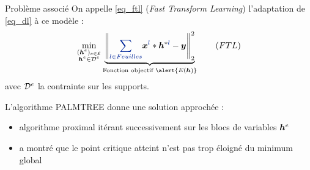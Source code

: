 \begin{frame}{Problème associé}
On appelle \eqref{eq_ftl} (\emph{Fast Transform Learning}) l'adaptation de \eqref{eq_dl} à ce modèle :
\begin{equation*}
\min_{\substack{(\h^e)_{e \in \E} \\ \h^e \in \Dspace^e}}
	\underbrace{\norm{\Beq{\sum_{l \in Feuilles}} \x^{\Beq{l}} * \h^{*\Beq{l}} -\y}{2}^2}_{\text{Fonction objectif } \alert{E(\h)}} \tag{${FTL}$} \label{eq_ftl}
\end{equation*}
avec ${\mathcal D}^e$ la contrainte sur les supports.

L'algorithme \alert{PALMTREE} donne une solution approchée :
\begin{itemize}
	\item algorithme proximal itérant successivement sur les blocs de variables $\bm{h}^e$
	\item \cite{chabiron_optimization_2016} a montré que le point  critique atteint n'est pas trop éloigné du minimum global
\end{itemize}
\end{frame}

